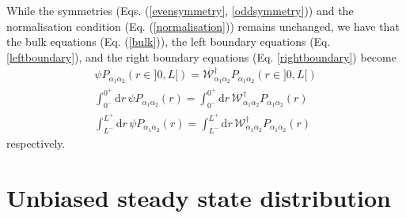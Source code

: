 \documentclass[pre,aps,superscriptaddress,nofootinbib]{revtex4}
\begin{document}
While the symmetries (Eqs. (\ref{evensymmetry}, \ref{oddsymmetry})) and the normalisation condition (Eq. (\ref{normalisation})) remains unchanged, we have that the bulk equations (Eq. (\ref{bulk})), the left boundary equations (Eq. \ref{leftboundary}), and the right boundary equations (Eq. \ref{rightboundary}) become
\begin{eqnarray}
\label{bulk:biased}
\psi P_{\alpha_1\alpha_2}(r \in ]0, L[) = \mathcal{W}^{\dagger}_{\alpha_1\alpha_2} P_{\alpha_1\alpha_2}(r \in ]0, L[)\\
\label{leftboundary:biased}
\int_{0^-}^{0^+} \mathrm{d}r \, \psi P_{\alpha_1\alpha_2}(r) = \int_{0^-}^{0^+} \mathrm{d}r \, \mathcal{W}^{\dagger}_{\alpha_1\alpha_2} P_{\alpha_1\alpha_2}(r)\\
\label{rightboundary:biased}
\int_{L^-}^{L^+} \mathrm{d}r \, \psi P_{\alpha_1\alpha_2}(r) = \int_{L^-}^{L^+} \mathrm{d}r \, \mathcal{W}^{\dagger}_{\alpha_1\alpha_2} P_{\alpha_1\alpha_2}(r)
\end{eqnarray}
respectively.

\section{Unbiased steady state distribution}
\end{document}
